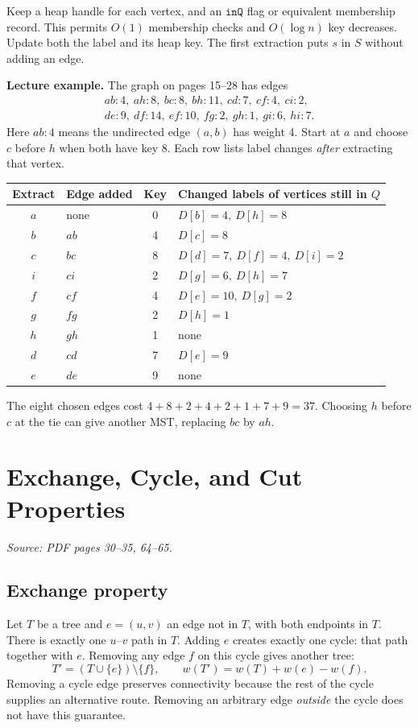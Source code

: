 \documentclass[11pt,letterpaper]{article}
\newcommand{\sourcepages}[1]{\textit{Source: PDF pages #1.}}
\begin{document}
Keep a heap handle for each vertex, and an $\texttt{inQ}$ flag or equivalent membership record. This permits $O(1)$ membership checks and $O(\log n)$ key decreases. Update both the label and its heap key. The first extraction puts $s$ in $S$ without adding an edge.

\textbf{Lecture example.} The graph on pages 15--28 has edges
\[
\begin{gathered}
ab:4,\ ah:8,\ bc:8,\ bh:11,\ cd:7,\ cf:4,\ ci:2,\\
de:9,\ df:14,\ ef:10,\ fg:2,\ gh:1,\ gi:6,\ hi:7.
\end{gathered}
\]
Here $ab:4$ means the undirected edge $(a,b)$ has weight 4. Start at $a$ and choose $c$ before $h$ when both have key 8. Each row lists label changes \emph{after} extracting that vertex.

\begin{center}\small
\begin{tabular}{clcl}
\toprule
Extract & Edge added & Key & Changed labels of vertices still in $Q$ \\
\midrule
$a$ & none & 0 & $D[b]=4,\ D[h]=8$ \\
$b$ & $ab$ & 4 & $D[c]=8$ \\
$c$ & $bc$ & 8 & $D[d]=7,\ D[f]=4,\ D[i]=2$ \\
$i$ & $ci$ & 2 & $D[g]=6,\ D[h]=7$ \\
$f$ & $cf$ & 4 & $D[e]=10,\ D[g]=2$ \\
$g$ & $fg$ & 2 & $D[h]=1$ \\
$h$ & $gh$ & 1 & none \\
$d$ & $cd$ & 7 & $D[e]=9$ \\
$e$ & $de$ & 9 & none \\
\bottomrule
\end{tabular}
\end{center}
The eight chosen edges cost $4+8+2+4+2+1+7+9=\boxed{37}$. Choosing $h$ before $c$ at the tie can give another MST, replacing $bc$ by $ah$.

\newpage
\section{Exchange, Cycle, and Cut Properties}
\sourcepages{30--35, 64--65}

\subsection{Exchange property}
Let $T$ be a tree and $e=(u,v)$ an edge not in $T$, with both endpoints in $T$. There is exactly one $u$--$v$ path in $T$. Adding $e$ creates exactly one cycle: that path together with $e$. Removing any edge $f$ on this cycle gives another tree:
\[
 T'=(T\cup\{e\})\setminus\{f\},\qquad
 w(T')=w(T)+w(e)-w(f).
\]
Removing a cycle edge preserves connectivity because the rest of the cycle supplies an alternative route. Removing an arbitrary edge \emph{outside} the cycle does not have this guarantee.
\end{document}
